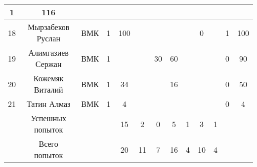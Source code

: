 \documentclass[10pt, a4paper, landscape]{article}
\begin{document}
\begin{center}
\begin{longtable}{|c|c|c|c|*{7}{c|}c|c|}
1 &
116 \\
\hline
18 &
Мырзабеков Руслан &
ВМК & 1 &
100 &
  &
  &
  &
  &
0 &
  &
1 &
100 \\
\hline
19 &
Алимгазиев Сержан &
ВМК & 1 &
  &
  &
30 &
60 &
  &
  &
  &
0 &
90 \\
\hline
20 &
Кожемяк Виталий &
ВМК & 1 &
34 &
  &
  &
16 &
  &
  &
  &
0 &
50 \\
\hline
21 &
Татин Алмаз &
ВМК & 1 &
4 &
  &
  &
  &
  &
  &
  &
0 &
4 \\
\hline
 & Успешных попыток & & &
15 &
2 &
0 &
5 &
1 &
3 &
1 & & \\
\hline 
 & Всего попыток & & &
20 &
11 &
7 &
16 &
4 &
10 &
4 & & \\
\hline 
\end{longtable} 
\end{center}
\renewcommand{\arraystretch}{1}
\end{document}

